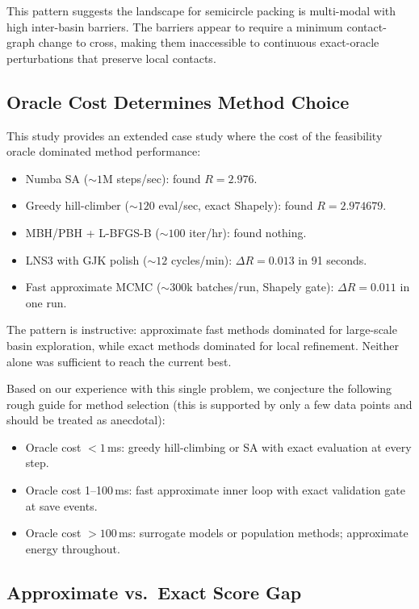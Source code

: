 \documentclass[11pt]{article}
\begin{document}
This pattern suggests the landscape for semicircle packing is multi-modal with high inter-basin barriers. The barriers appear to require a minimum contact-graph change to cross, making them inaccessible to continuous exact-oracle perturbations that preserve local contacts.

\subsection{Oracle Cost Determines Method Choice}
\label{sec:oraclecost}

This study provides an extended case study where the cost of the feasibility oracle dominated method performance:

\begin{itemize}
  \item Numba SA (${\sim}1$M steps/sec): found $R = 2.976$.
  \item Greedy hill-climber (${\sim}120$ eval/sec, exact Shapely): found $R = 2.974679$.
  \item MBH/PBH + L-BFGS-B (${\sim}100$ iter/hr): found nothing.
  \item LNS3 with GJK polish (${\sim}12$ cycles/min): $\Delta R = 0.013$ in 91 seconds.
  \item Fast approximate MCMC (${\sim}300$k batches/run, Shapely gate): $\Delta R = 0.011$ in one run.
\end{itemize}

The pattern is instructive: approximate fast methods dominated for large-scale basin exploration, while exact methods dominated for local refinement. Neither alone was sufficient to reach the current best.

Based on our experience with this single problem, we conjecture the following rough guide for method selection (this is supported by only a few data points and should be treated as anecdotal):

\begin{itemize}
  \item Oracle cost $< 1$\,ms: greedy hill-climbing or SA with exact evaluation at every step.
  \item Oracle cost 1--100\,ms: fast approximate inner loop with exact validation gate at save events.
  \item Oracle cost $> 100$\,ms: surrogate models or population methods; approximate energy throughout.
\end{itemize}

\subsection{Approximate vs.\ Exact Score Gap}
\end{document}
